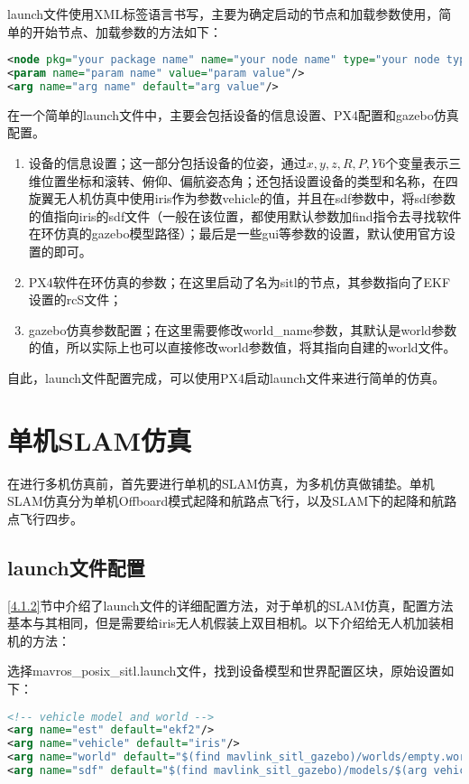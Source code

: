 launch文件使用XML标签语言书写，主要为确定启动的节点和加载参数使用，简单的开始节点、加载参数的方法如下：

\begin{lstlisting}[language={XML}]
<node pkg="your package name" name="your node name" type="your node type"/>
<param name="param name" value="param value"/>
<arg name="arg name" default="arg value"/>
\end{lstlisting}

在一个简单的launch文件中，主要会包括设备的信息设置、PX4配置和gazebo仿真配置。

\begin{enumerate}
	\item 设备的信息设置；这一部分包括设备的位姿，通过$x,y,z,R,P,Y$6个变量表示三维位置坐标和滚转、俯仰、偏航姿态角；还包括设置设备的类型和名称，在四旋翼无人机仿真中使用iris作为参数vehicle的值，并且在sdf参数中，将sdf参数的值指向iris的sdf文件（一般在该位置，都使用默认参数加find指令去寻找软件在环仿真的gazebo模型路径）；最后是一些gui等参数的设置，默认使用官方设置的即可。
	\item PX4软件在环仿真的参数；在这里启动了名为sitl的节点，其参数指向了EKF设置的rcS文件；
	\item gazebo仿真参数配置；在这里需要修改world\_name参数，其默认是world参数的值，所以实际上也可以直接修改world参数值，将其指向自建的world文件。
\end{enumerate}

自此，launch文件配置完成，可以使用PX4启动launch文件来进行简单的仿真。


\section{单机SLAM仿真}

在进行多机仿真前，首先要进行单机的SLAM仿真，为多机仿真做铺垫。单机SLAM仿真分为单机Offboard模式起降和航路点飞行，以及SLAM下的起降和航路点飞行四步。

\subsection{launch文件配置} \label{4.2.1}

\ref{4.1.2}节中介绍了launch文件的详细配置方法，对于单机的SLAM仿真，配置方法基本与其相同，但是需要给iris无人机假装上双目相机。以下介绍给无人机加装相机的方法：

选择mavros\_posix\_sitl.launch文件，找到设备模型和世界配置区块，原始设置如下：

\begin{lstlisting}[language={XML}]
<!-- vehicle model and world -->
<arg name="est" default="ekf2"/>
<arg name="vehicle" default="iris"/>
<arg name="world" default="$(find mavlink_sitl_gazebo)/worlds/empty.world"/>
<arg name="sdf" default="$(find mavlink_sitl_gazebo)/models/$(arg vehicle)/$(arg vehicle).sdf"/>
\end{lstlisting}

